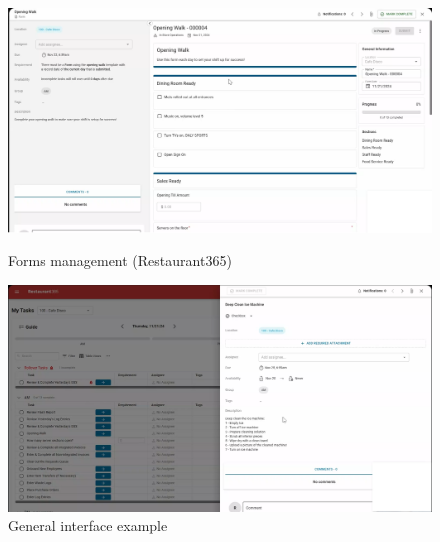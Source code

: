 \documentclass[]{VUMIFTemplateClass}
\begin{document}
\begin{figure}[h]
    \centering
    \begin{minipage}{0.48\textwidth}
        \centering
        \includegraphics[width=\textwidth]{images/examples/forms_r365.png}
        \caption{Forms management (Restaurant365)}
    \end{minipage}
    \hfill
    \begin{minipage}{0.48\textwidth}
        \centering
        \includegraphics[width=\textwidth]{images/examples/image.png}
        \caption{General interface example}
    \end{minipage}
\end{figure}
\end{document}
